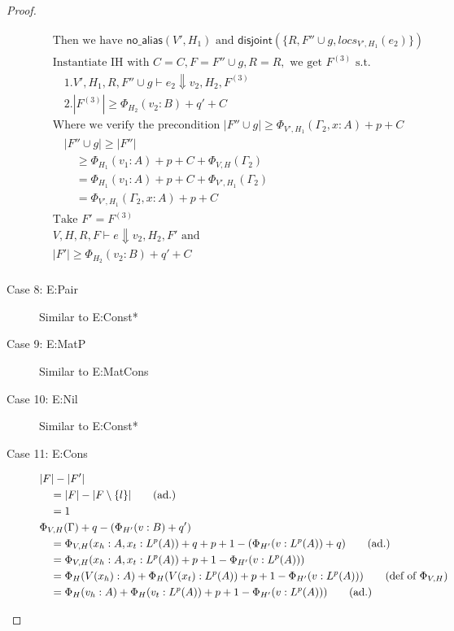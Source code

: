 \documentclass[11pt]{article}
\newcommand{\na}[1]{\mathsf{no\_alias}(#1)}
\newcommand{\dist}[1]{\mathsf{disjoint}(#1)}
\begin{document}
\begin{proof}
\begin{description}
\begin{align*}
  &\text{Then we have } \na{V',H_1} \text{ and } \dist{\{R, F'' \cup g, locs_{V',H_1}(e_2)\}} \tag{similar to case in Lemma 1.2}\\
  &\text{Instantiate IH with } C = C, F = F'' \cup g, R = R, \text{ we get } F^{(3)} \text{ s.t. }\\
  &\quad 1. V',H_1,R, F'' \cup g \vdash e_2 \Downarrow v_2,H_2,F^{(3)} \\
  &\quad 2. |F^{(3)}| \ge \Phi_{H_2}(v_2:B) + q' + C\\
  &\text{Where we verify the precondition } |F'' \cup g| \ge \Phi_{V',H_1}(\Gamma_2,x:A) + p + C\\
  &\quad |F'' \cup g | \ge |F''|\\
  &\quad \quad \ge \Phi_{H_1}(v_1:A) + p + C + \Phi_{V,H}(\Gamma_2) \tag{IH}\\ 
  &\quad \quad = \Phi_{H_1}(v_1:A) + p + C + \Phi_{V',H_1}(\Gamma_2) \tag{Lemma 4.3.3}\\ 
  &\quad \quad = \Phi_{V',H_1}(\Gamma_2,x:A) + p + C \tag{def of $\Phi$}\\
  &\text{Take } F' = F^{(3)}\\
  &V,H,R,F \vdash e \Downarrow v_2, H_2,F' \text{ and } \tag{E:Let}\\ 
  &|F'| \ge \Phi_{H_2}(v_2:B) + q' + C \tag{from IH}\\
  \end{align*}
  \item[Case 8: E:Pair]
  Similar to E:Const*
  \item[Case 9: E:MatP]
  Similar to E:MatCons
  \item[Case 10: E:Nil]
  Similar to E:Const*
  \item[Case 11: E:Cons]
  \begin{align*}
  &|F| - |F'|\\
  &\quad = |F| - |F \setminus \{l\}| \tag{ad.}\\
  &\quad = 1\\
  &\Phi_{V,H}(\Gamma) +q - (\Phi_{H'}(v:B) + q')\\
  &\quad = \Phi_{V,H}(x_h : A,x_t:L^p(A)) + q + p + 1 - (\Phi_{H'}(v:L^p(A)) + q) \tag{ad.}\\
  &\quad = \Phi_{V,H}(x_h : A,x_t:L^p(A)) + p + 1 - \Phi_{H'}(v:L^p(A))) \\
  &\quad = \Phi_{H}(V(x_h):A) + \Phi_{H}(V(x_t):L^p(A)) + p + 1 - \Phi_{H'}(v:L^p(A))) \tag{def of $\Phi_{V,H}$}\\
  &\quad = \Phi_{H}(v_h:A) + \Phi_{H}(v_t:L^p(A)) + p + 1 - \Phi_{H'}(v:L^p(A))) \tag{ad.}\\

\end{align*}
\end{description}
\end{proof}
\end{document}
